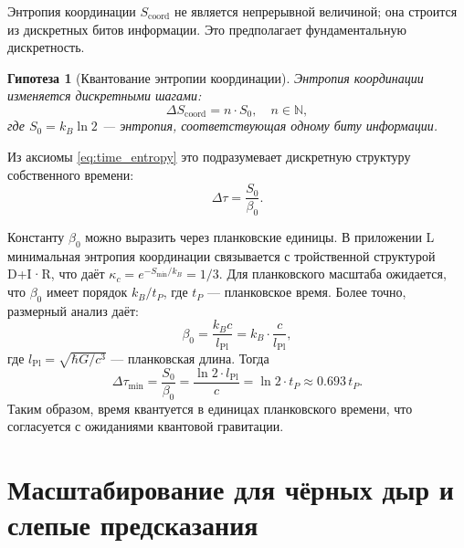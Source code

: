 \documentclass[12pt,a4paper]{article}
\newtheorem{hypothesis}[theorem]{Гипотеза}
\newcommand{\kappac}{\kappa_c}
\newcommand{\Lpl}{l_{\mathrm{Pl}}}
\newcommand{\Scoord}{S_{\mathrm{coord}}}
\begin{document}
	Энтропия координации \(\Scoord\) не является непрерывной величиной; она строится из дискретных битов информации. Это предполагает фундаментальную дискретность.
	
	\begin{hypothesis}[Квантование энтропии координации]
		Энтропия координации изменяется дискретными шагами:
		\begin{equation}
			\Delta \Scoord = n \cdot S_0, \quad n \in \mathbb{N},
		\end{equation}
		где \(S_0 = k_B \ln 2\) — энтропия, соответствующая одному биту информации.
	\end{hypothesis}
	
	Из аксиомы \ref{eq:time_entropy} это подразумевает дискретную структуру собственного времени:
	\begin{equation}
		\Delta \tau = \frac{S_0}{\beta_0}.
	\end{equation}
	
	Константу \(\beta_0\) можно выразить через планковские единицы. В приложении L минимальная энтропия координации связывается с тройственной структурой D+I·R, что даёт \(\kappac = e^{-S_{\min}/k_B} = 1/3\). Для планковского масштаба ожидается, что \(\beta_0\) имеет порядок \(k_B / t_P\), где \(t_P\) — планковское время. Более точно, размерный анализ даёт:
	\begin{equation}
		\beta_0 = \frac{k_B c}{\Lpl} = k_B \cdot \frac{c}{\Lpl},
	\end{equation}
	где \(\Lpl = \sqrt{\hbar G/c^3}\) — планковская длина. Тогда
	\begin{equation}
		\Delta \tau_{\min} = \frac{S_0}{\beta_0} = \frac{\ln 2 \cdot \Lpl}{c} = \ln 2 \cdot t_P \approx 0.693 \, t_P.
	\end{equation}
	Таким образом, время квантуется в единицах планковского времени, что согласуется с ожиданиями квантовой гравитации.
	
	\section{Масштабирование для чёрных дыр и слепые предсказания}
	\label{sec:blackhole}
	
\end{document}
